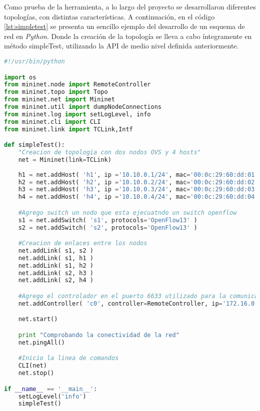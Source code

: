 Como prueba de la herramienta, a lo largo del proyecto se desarrollaron diferentes topologías, con distintas características. A continuación, en el código \ref{lst:simpletest} se presenta un sencillo ejemplo del desarrollo de un esquema de red en \textit{Python}. Donde la creación de la topología se lleva a cabo íntegramente en método simpleTest, utilizando la API de medio nivel definida anteriormente. 

\begin{lstlisting}[caption={Creación de una topología sencilla en Mininet}, captionpos=b, label={lst:simpletest}, language=Python]
#!/usr/bin/python                                                                            

import os                                                                            
from mininet.node import RemoteController                                                                                     
from mininet.topo import Topo
from mininet.net import Mininet
from mininet.util import dumpNodeConnections
from mininet.log import setLogLevel, info
from mininet.cli import CLI
from mininet.link import TCLink,Intf

def simpleTest():
    "Creacion de topologia con dos nodos OVS y 4 hosts"
	net = Mininet(link=TCLink)
	
    h1 = net.addHost( 'h1', ip ='10.10.0.1/24', mac='00:0c:29:60:dd:01')
    h2 = net.addHost( 'h2', ip ='10.10.0.2/24', mac='00:0c:29:60:dd:02')
    h3 = net.addHost( 'h3', ip ='10.10.0.3/24', mac='00:0c:29:60:dd:03')
    h4 = net.addHost( 'h4', ip ='10.10.0.4/24', mac='00:0c:29:60:dd:04')

    #Agrego switch un nodo que esta ejecuatndo un switch openflow
    s1 = net.addSwitch( 's1', protocols='OpenFlow13' )
    s2 = net.addSwitch( 's2', protocols='OpenFlow13' )

    #Creacion de enlaces entre los nodos
    net.addLink( s1, s2 )  
    net.addLink( s1, h1 )  
    net.addLink( s1, h2 )
    net.addLink( s2, h3 )
    net.addLink( s2, h4 )

    #Agrego el controlador en el puerto 6633 utilizado para la comunicacion con los dispositivos
    net.addController( 'c0', controller=RemoteController, ip='172.16.0.167', port=6633 ) 

	net.start()

    print "Comprobando la conectividad de la red"
    net.pingAll()

    #Inicio la linea de comandos
    CLI(net)
    net.stop()

if __name__ == '__main__':
    setLogLevel('info')
    simpleTest()
\end{lstlisting}
